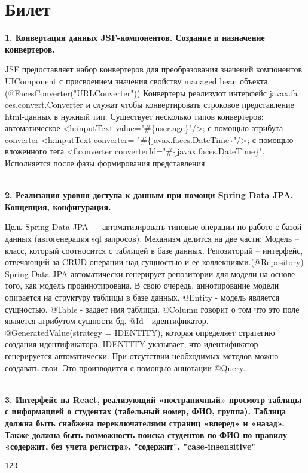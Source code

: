 \documentclass{article}
\newcommand{\bil}[5]{%
        \section{Билет}
        \textbf{1. #1}

        #4
        \\
        \textbf{2. #2}
        
        #5
        \\
        \textbf{3. #3}
}
\begin{document}
\bil{Конвертация данных JSF-компонентов. Создание и назначение конвертеров.}
{Реализация уровня доступа к данным при помощи Spring Data JPA. Концепция, конфигурация.}
{Интерфейс на React, реализующий «постраничный» просмотр таблицы с информацией о студентах (табельный номер, ФИО, группа). Таблица должна быть снабжена переключателями страниц «вперед» и «назад». Также должна быть возможность поиска студентов по ФИО по правилу «содержит, без учета регистра». "содержит", "case-insensitive" }{
    JSF предоставляет набор конвертеров для преобразования значений компонентов UIComponent с присвоением значения свойству managed bean объекта. (@FacesConverter("URLConverter"))
    Конвертеры реализуют интерфейс javax.fa ces.convert.Converter и служат чтобы конвертировать строковое представление html-данных в нужный тип. Существует несколько типов конвертеров: автоматическое <h:inputText value="\#\{user.age\}"/>; с помощью атрибута converter <h:inputText converter= "\#\{javax.faces.DateTime\}"/>;
    с помощью вложенного тега <f:converter converterId="\#\{javax.faces.DateTime\}".
    Исполняется после фазы формирования представления.
}{
    Цель Spring Data JPA — автоматизировать типовые операции по работе с базой данных (автогенерация sql запросов). 
    Механизм делится на две части:
    Модель – класс, который соотносится с таблицей в базе данных.
    Репозиторий – интерфейс, отвечающий за CRUD-операции над сущностью и ее коллекциями.(@Repository)
    Spring Data JPA автоматически генерирует репозитории для модели на основе того, как модель проаннотирована. 
    В свою очередь, аннотирование модели опирается на структуру таблицы в базе данных.
    @Entity - модель является сущностью.
    @Table - задает имя таблицы.
    @Column говорит о том что это поле является атрибутом сущности бд.
    @Id - идентификатор.
    @GeneratedValue(strategy = IDENTITY), которая определяет стратегию создания идентификатора. IDENTITY указывает, что идентификатор генерируется автоматически.
    При отсутствии необходимых методов можно создавать свои. Это производится с помощью аннотации @Query.
}
\begin{lstlisting}[frame=single, basicstyle=\ttfamily, breaklines=true, breakatwhitespace=true, postbreak=\mbox{\textcolor{red}{$\hookrightarrow$}\space}]
123
\end{lstlisting}
\end{document}
